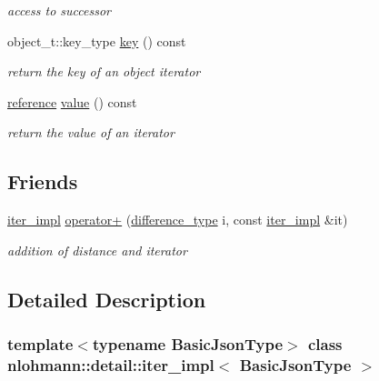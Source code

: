 \begin{DoxyCompactItemize}
\begin{DoxyCompactList}\small\item\em access to successor \end{DoxyCompactList}\item 
object\+\_\+t\+::key\+\_\+type \mbox{\hyperlink{classnlohmann_1_1detail_1_1iter__impl_a3a541a223320f6635f2f188ba54f8818}{key}} () const
\begin{DoxyCompactList}\small\item\em return the key of an object iterator \end{DoxyCompactList}\item 
\mbox{\hyperlink{classnlohmann_1_1detail_1_1iter__impl_a5be8001be099c6b82310f4d387b953ce}{reference}} \mbox{\hyperlink{classnlohmann_1_1detail_1_1iter__impl_ab447c50354c6611fa2ae0100ac17845c}{value}} () const
\begin{DoxyCompactList}\small\item\em return the value of an iterator \end{DoxyCompactList}\end{DoxyCompactItemize}
\subsection*{Friends}
\begin{DoxyCompactItemize}
\item 
\mbox{\hyperlink{classnlohmann_1_1detail_1_1iter__impl}{iter\+\_\+impl}} \mbox{\hyperlink{classnlohmann_1_1detail_1_1iter__impl_a94108d1a7563e103534f23eb5c1ee175}{operator+}} (\mbox{\hyperlink{classnlohmann_1_1detail_1_1iter__impl_a2f7ea9f7022850809c60fc3263775840}{difference\+\_\+type}} i, const \mbox{\hyperlink{classnlohmann_1_1detail_1_1iter__impl}{iter\+\_\+impl}} \&it)
\begin{DoxyCompactList}\small\item\em addition of distance and iterator \end{DoxyCompactList}\end{DoxyCompactItemize}


\subsection{Detailed Description}
\subsubsection*{template$<$typename Basic\+Json\+Type$>$\newline
class nlohmann\+::detail\+::iter\+\_\+impl$<$ Basic\+Json\+Type $>$}

